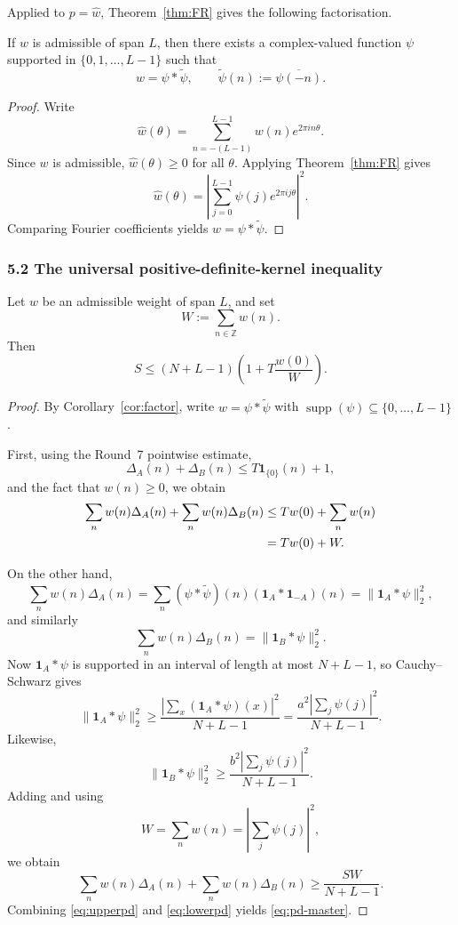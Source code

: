 Applied to $p=\widehat w$, Theorem~\ref{thm:FR} gives the following factorisation.

\begin{corollary}
\label{cor:factor}
If $w$ is admissible of span $L$, then there exists a complex-valued function $\psi$ supported in $\{0,1,\dots,L-1\}$ such that
\[
w=\psi*\widetilde\psi,
\qquad \widetilde\psi(n):=\overline{\psi(-n)}.
\]
\end{corollary}

\begin{proof}
Write
\[
\widehat w(\theta)=\sum_{n=-(L-1)}^{L-1} w(n)e^{2\pi i n\theta}.
\]
Since $w$ is admissible, $\widehat w(\theta)\ge 0$ for all $\theta$.  Applying Theorem~\ref{thm:FR} gives
\[
\widehat w(\theta)=\left|\sum_{j=0}^{L-1}\psi(j)e^{2\pi i j\theta}\right|^2.
\]
Comparing Fourier coefficients yields $w=\psi*\widetilde\psi$.
\end{proof}

\subsubsection{5.2 The universal positive-definite-kernel inequality}

\begin{proposition}
\label{prop:pd-bound}
Let $w$ be an admissible weight of span $L$, and set
\[
W:=\sum_{n\in\mathbb Z} w(n).
\]
Then
\begin{equation}
\label{eq:pd-master}
S\le (N+L-1)\left(1+T\frac{w(0)}{W}\right).
\end{equation}
\end{proposition}

\begin{proof}
By Corollary~\ref{cor:factor}, write $w=\psi*\widetilde\psi$ with $\operatorname{supp}(\psi)\subseteq\{0,\dots,L-1\}$.

First, using the Round~7 pointwise estimate,
\[
\Delta_A(n)+\Delta_B(n)\le T\mathbf 1_{\{0\}}(n)+1,
\]
and the fact that $w(n)\ge0$, we obtain
\begin{align}
\sum_n w(n)\Delta_A(n)+\sum_n w(n)\Delta_B(n)
&\le T w(0)+\sum_n w(n)\notag\\
&=T w(0)+W.
\label{eq:upperpd}
\end{align}

On the other hand,
\[
\sum_n w(n)\Delta_A(n)=\sum_n (\psi*\widetilde\psi)(n)(\mathbf 1_A*\mathbf 1_{-A})(n)=\|\mathbf 1_A*\psi\|_2^2,
\]
and similarly
\[
\sum_n w(n)\Delta_B(n)=\|\mathbf 1_B*\psi\|_2^2.
\]
Now $\mathbf 1_A*\psi$ is supported in an interval of length at most $N+L-1$, so Cauchy--Schwarz gives
\[
\|\mathbf 1_A*\psi\|_2^2\ge \frac{\left|\sum_x (\mathbf 1_A*\psi)(x)\right|^2}{N+L-1}
=\frac{a^2\left|\sum_j \psi(j)\right|^2}{N+L-1}.
\]
Likewise,
\[
\|\mathbf 1_B*\psi\|_2^2\ge \frac{b^2\left|\sum_j \psi(j)\right|^2}{N+L-1}.
\]
Adding and using
\[
W=\sum_n w(n)=\left|\sum_j \psi(j)\right|^2,
\]
we obtain
\begin{equation}
\label{eq:lowerpd}
\sum_n w(n)\Delta_A(n)+\sum_n w(n)\Delta_B(n)
\ge \frac{SW}{N+L-1}.
\end{equation}
Combining \eqref{eq:upperpd} and \eqref{eq:lowerpd} yields \eqref{eq:pd-master}.
\end{proof}

